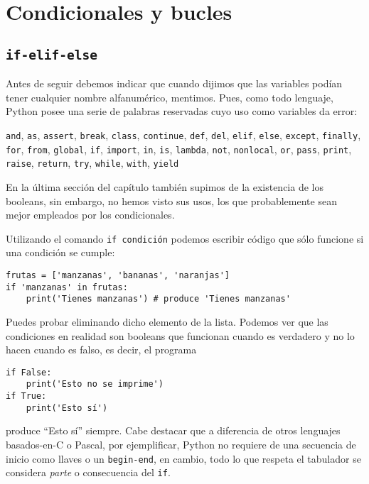 \documentclass[11pt,twoside]{report}
\begin{document}
\chapter{Condicionales y bucles}
\section{\texttt{if-elif-else}}
Antes de seguir debemos indicar que cuando dijimos que las variables podían tener cualquier nombre alfanumérico, mentimos. Pues, como todo lenguaje, Python posee una serie de palabras reservadas cuyo uso como variables da error:
\begin{center}
\lstinline|and|, \lstinline|as|, \lstinline|assert|, \lstinline|break|, \lstinline|class|, \lstinline|continue|, \lstinline|def|, \lstinline|del|, \lstinline|elif|, \lstinline|else|, \lstinline|except|, \lstinline|finally|, \lstinline|for|, \lstinline|from|, \lstinline|global|, \lstinline|if|, \lstinline|import|, \lstinline|in|, \lstinline|is|, \lstinline|lambda|, \lstinline|not|, \lstinline|nonlocal|, \lstinline|or|, \lstinline|pass|, \lstinline|print|, \lstinline|raise|, \lstinline|return|, \lstinline|try|, \lstinline|while|, \lstinline|with|, \lstinline|yield|
\end{center}
En la última sección del capítulo también supimos de la existencia de los booleans, sin embargo, no hemos visto sus usos, los que probablemente sean mejor empleados por los condicionales.

Utilizando el comando \lstinline|if condición| podemos escribir código que sólo funcione si una condición se cumple:
\begin{lstlisting}
frutas = ['manzanas', 'bananas', 'naranjas']
if 'manzanas' in frutas:
    print('Tienes manzanas') # produce 'Tienes manzanas'
\end{lstlisting}
Puedes probar eliminando dicho elemento de la lista. Podemos ver que las condiciones en realidad son booleans que funcionan cuando es verdadero y no lo hacen cuando es falso, es decir, el programa
\begin{lstlisting}
if False:
	print('Esto no se imprime')
if True:
	print('Esto sí')
\end{lstlisting}
produce ``Esto sí'' siempre. Cabe destacar que a diferencia de otros lenguajes basados-en-C o Pascal, por ejemplificar, Python no requiere de una secuencia de inicio como llaves o un \lstinline|begin-end|, en cambio, todo lo que respeta el tabulador se considera \textit{parte} o consecuencia del \lstinline|if|.
\end{document}
